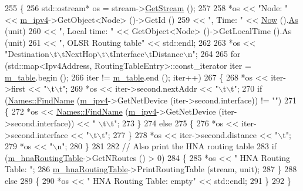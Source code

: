 \begin{DoxyCode}
255 \{
256   std::ostream* os = stream->\hyperlink{classns3_1_1OutputStreamWrapper_a0cf30a4188ab6fdae2b2ab74db11acc2}{GetStream} ();
257 
258   *os << \textcolor{stringliteral}{"Node: "} << \hyperlink{classns3_1_1olsr_1_1RoutingProtocol_afede79b25ec57e797ff900ae01bca1df}{m\_ipv4}->GetObject<Node> ()->GetId ()
259       << \textcolor{stringliteral}{", Time: "} << \hyperlink{group__simulator_gac3635e2e87f7ce316c89290ee1b01d0d}{Now} ().\hyperlink{classns3_1_1Time_a0bb1110638ce9938248bd07865a328ab}{As} (unit)
260       << \textcolor{stringliteral}{", Local time: "} << GetObject<Node> ()->GetLocalTime ().As (unit)
261       << \textcolor{stringliteral}{", OLSR Routing table"} << std::endl;
262 
263   *os << \textcolor{stringliteral}{"Destination\(\backslash\)t\(\backslash\)tNextHop\(\backslash\)t\(\backslash\)tInterface\(\backslash\)tDistance\(\backslash\)n"};
264 
265   \textcolor{keywordflow}{for} (std::map<Ipv4Address, RoutingTableEntry>::const\_iterator iter = \hyperlink{classns3_1_1olsr_1_1RoutingProtocol_a9703fb92cc9a864c0e2874387ead3aa3}{m\_table}.begin ();
266        iter != \hyperlink{classns3_1_1olsr_1_1RoutingProtocol_a9703fb92cc9a864c0e2874387ead3aa3}{m\_table}.end (); iter++)
267     \{
268       *os << iter->first << \textcolor{stringliteral}{"\(\backslash\)t\(\backslash\)t"};
269       *os << iter->second.nextAddr << \textcolor{stringliteral}{"\(\backslash\)t\(\backslash\)t"};
270       \textcolor{keywordflow}{if} (\hyperlink{classns3_1_1Names_ab9664faf23569aaae64a2d1f65265045}{Names::FindName} (\hyperlink{classns3_1_1olsr_1_1RoutingProtocol_afede79b25ec57e797ff900ae01bca1df}{m\_ipv4}->GetNetDevice (iter->second.interface)) != \textcolor{stringliteral}{""})
271         \{
272           *os << \hyperlink{classns3_1_1Names_ab9664faf23569aaae64a2d1f65265045}{Names::FindName} (\hyperlink{classns3_1_1olsr_1_1RoutingProtocol_afede79b25ec57e797ff900ae01bca1df}{m\_ipv4}->GetNetDevice (iter->second.interface)) << \textcolor{stringliteral}{"
      \(\backslash\)t\(\backslash\)t"};
273         \}
274       \textcolor{keywordflow}{else}
275         \{
276           *os << iter->second.interface << \textcolor{stringliteral}{"\(\backslash\)t\(\backslash\)t"};
277         \}
278       *os << iter->second.distance << \textcolor{stringliteral}{"\(\backslash\)t"};
279       *os << \textcolor{stringliteral}{"\(\backslash\)n"};
280     \}
281 
282   \textcolor{comment}{// Also print the HNA routing table}
283   \textcolor{keywordflow}{if} (\hyperlink{classns3_1_1olsr_1_1RoutingProtocol_a398799911ae136e0b247b4bbd608c336}{m\_hnaRoutingTable}->GetNRoutes () > 0)
284     \{
285       *os << \textcolor{stringliteral}{" HNA Routing Table: "};
286       \hyperlink{classns3_1_1olsr_1_1RoutingProtocol_a398799911ae136e0b247b4bbd608c336}{m\_hnaRoutingTable}->PrintRoutingTable (stream, unit);
287     \}
288   \textcolor{keywordflow}{else}
289     \{
290       *os << \textcolor{stringliteral}{" HNA Routing Table: empty"} << std::endl;
291     \}
292 \}
\end{DoxyCode}


